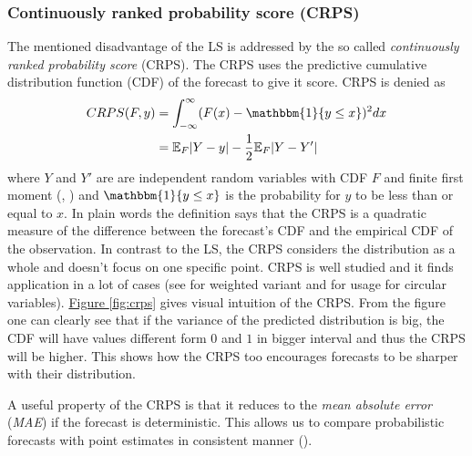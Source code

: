 \documentclass[12pt,a4paper,twoside]{scrartcl}
\numberwithin{equation}{section}
\newcommand{\reffig}[1]{\hyperref[#1]{Figure \ref*{#1}}}
\begin{document}
\subsubsection{Continuously ranked probability score (CRPS)}\label{sec:crps}
The mentioned disadvantage of the LS is addressed by the so called \emph{continuously ranked probability score} (CRPS). The CRPS uses the predictive cumulative distribution function (CDF) of the forecast to give it score. CRPS is denied as
\begin{align}
  \label{eq:crps}
  CRPS(F,y)  &= \int_{-\infty}^{\infty}(F(x) - \mathbbm{1}\{y \leq x \})^2dx \\
             &= \mathbb{E}_F|Y - y| - \frac{1}{2}\mathbb{E}_F|Y - Y'|
\end{align}
where \(Y\) and \(Y'\) are are independent random variables with CDF \(F\) and finite first moment (\cite{rafteryg2007}, \cite{matheson1976}) and \(\mathbbm{1}\{y \leq x \}\) is the probability for \(y\) to be less than or equal to \(x \). In plain words the definition says that the CRPS is a quadratic measure of the difference between the forecast's CDF and the empirical CDF of the observation. In contrast to the LS, the CRPS considers the distribution as a whole and doesn't focus on one specific point. CRPS is well studied and it finds application in a lot of cases (see \cite{ranjan2011} for weighted variant and \cite{grimit2007} for usage for circular variables). \reffig{fig:crps} gives visual intuition of the CRPS. From the figure one can clearly see that if the variance of the predicted distribution is big, the CDF will have values different form \(0\) and \(1\) in bigger interval and thus the CRPS will be higher. This shows how the CRPS too encourages forecasts to be sharper with their distribution.


A useful property of the CRPS is that it reduces to the \emph{mean absolute error} (\emph{MAE}) if the forecast is deterministic. This allows us to compare probabilistic forecasts with point estimates in consistent manner (\cite{gneiting2014}).
\end{document}

